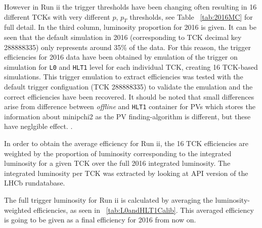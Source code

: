 However in Run \Rn{2} the trigger thresholds have been changing often resulting in 16 different TCKs with very different $p$, $p_{T}$ thresholds, see Table ~\autoref{tab:2016MC} for full detail. In the third column, luminosity proportion for 2016 is given. It can be seen that the default simulation in 2016 (corresponding to TCK decimal key 288888335) only represents around 35\% of the data. For this reason, the trigger efficiencies for 2016 data have been obtained by emulation of the trigger on simulation for \texttt{L0} and \texttt{HLT1} level for each individual TCK, creating 16 TCK-based simulations.  This trigger emulation to extract efficiencies was tested with the default trigger configuation (TCK 288888335) to validate the emulation and the correct efficiencies have been recovered. It should be noted that small differences arise from difference between \textit{offline} and \texttt{HLT1} container for \gls{PV}s which stores the information about \gls{minipchi2} as the \gls{PV} finding-algorithm is different, but these have neglgible effect. .

In order to obtain the average efficiency for Run \Rn{2}, the 16 TCK efficiencies are weighted by the proportion of luminosity corresponding to the integrated luminosity for a given TCK over the full 2016 integrated luminosity. The integrated luminosity per TCK was extracted by looking at API version of the LHCb rundatabase. 

The full trigger luminosity for Run \Rn{2} is calculated by averaging the luminosity-weighted efficiencies, as seen in ~\autoref{tab:L0andHLT1Calib}. This averaged efficiency is going to be given as a final efficiency for 2016 from now on.  


